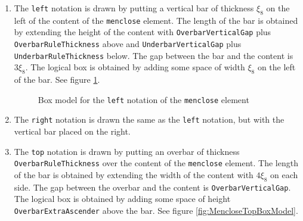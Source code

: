 \begin{enumerate}
\item The {\tt left} notation is drawn by putting a vertical bar of thickness
  $\xi_8$ on the left of the content of the {\tt menclose} element.
  The length of the bar is obtained by extending the height of the content
  with {\tt OverbarVerticalGap} plus
  {\tt OverbarRuleThickness} above
  and  {\tt UnderbarVerticalGap} plus
  {\tt UnderbarRuleThickness} below.
  The gap between the bar and the content is $3\xi_8$.
  The logical box is obtained by adding some space of width
  $\xi_8$ on the left of the bar. See figure \ref{fig:MencloseLeftBoxModel}.

  \begin{figure}
\centering
{}
  \caption{Box model for the {\tt left}
    notation of the {\tt menclose} element}
\label{fig:MencloseLeftBoxModel}
\end{figure}

\item The {\tt right} notation is drawn the same as the {\tt left} notation,
  but with the vertical bar placed on the right.

\item The {\tt top} notation is drawn by putting an overbar of thickness
  {\tt OverbarRuleThickness}
  over the content of the {\tt menclose} element.
  The length of the bar is obtained by extending the width of the content
  with $4\xi_8$ on each side.
  The gap between the overbar and the content is
  {\tt OverbarVerticalGap}.
  The logical box is obtained by adding some space of height
  {\tt OverbarExtraAscender} above the bar.
  See figure \ref{fig:MencloseTopBoxModel}.


\end{enumerate}
